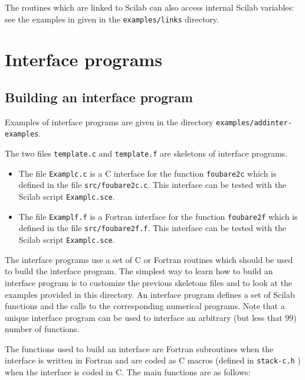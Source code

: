 The routines which are linked to Scilab can also access internal 
Scilab variables: see the examples in given in the {\tt examples/links}
directory.

\section{Interface programs}

\subsection{Building an interface program}
Examples of interface programs are given in the directory 
{\tt examples/addinter-examples}. 

\noindent
The two files {\tt template.c} and {\tt template.f} are skeletons of 
interface programs.
\begin{itemize}
\item The file {\tt Examplc.c} is a C interface for the function {\tt foubare2c} 
which is defined in the file {\tt src/foubare2c.c}. This interface can
be tested with the Scilab script {\tt Examplc.sce}.
\item The file {\tt Examplf.f} is a Fortran interface for the function
{\tt foubare2f} which is defined in the file {\tt src/foubare2f.f}. 
This interface can be tested with the Scilab script {\tt Examplc.sce}.
\end{itemize}
The interface programs use a set of C or 
Fortran routines which should be used to build the interface program.
The simplest way to learn how to build an interface program is to
customize the previous skeletons files and to look at the examples
provided in this
directory. An interface program defines a set of Scilab functions
and the calls to the corresponding numerical programs.
Note that a unique interface program can be used to interface an 
arbitrary (but less that $99$) number of functions.


\noindent
The functions used to build an interface are Fortran subroutines when 
the interface is written in Fortran and are coded as C macros 
(defined in {\tt  stack-c.h} ) 
when the interface is coded in C. The main functions are as follows:

